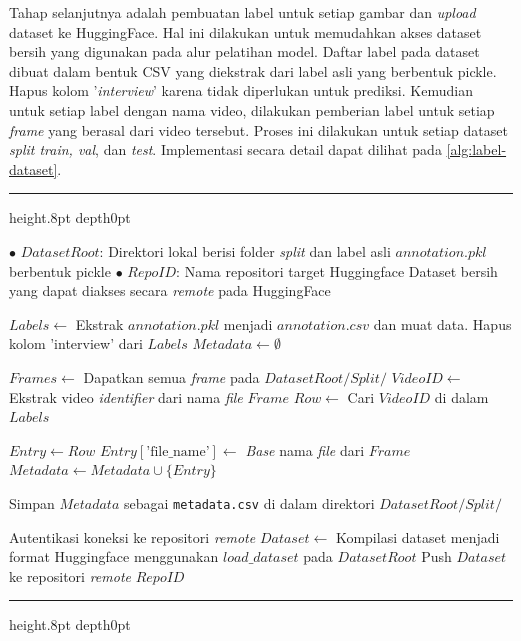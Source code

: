 Tahap selanjutnya adalah pembuatan label untuk setiap gambar dan \textit{upload} dataset ke HuggingFace. Hal ini dilakukan untuk memudahkan akses dataset bersih yang digunakan pada alur pelatihan model. Daftar label pada dataset dibuat dalam bentuk CSV yang diekstrak dari label asli yang berbentuk pickle. Hapus kolom '\textit{interview}' karena tidak diperlukan untuk prediksi. Kemudian untuk setiap label dengan nama video, dilakukan pemberian label untuk setiap \textit{frame} yang berasal dari video tersebut. Proses ini dilakukan untuk setiap dataset \textit{split train, val}, dan \textit{test}. Implementasi secara detail dapat dilihat pada \autoref{alg:label-dataset}.

{
	\vspace{2ex}
	\hrule height.8pt depth0pt \kern5pt
	
	\begin{algorithmic}[1]
		\Input 
		\Statex $\bullet$ $DatasetRoot$: Direktori lokal berisi folder \textit{split} dan label asli $annotation.pkl$ berbentuk pickle
		\Statex $\bullet$ $RepoID$: Nama repositori target Huggingface
		\Output Dataset bersih yang dapat diakses secara \textit{remote} pada HuggingFace
		
		\State $Labels \gets$ Ekstrak $annotation.pkl$ menjadi $annotation.csv$ dan muat data.
		\State Hapus kolom 'interview' dari $Labels$
		\State $Metadata \gets \emptyset$
		
		\State $Frames \gets$ Dapatkan semua \textit{frame} pada $DatasetRoot/Split/$
		\State $VideoID \gets$ Ekstrak video \textit{identifier} dari nama \textit{file} $Frame$
		\State $Row \gets$ Cari $VideoID$ di dalam $Labels$
		
		\State $Entry \gets Row$
		\State $Entry[\text{'file\_name'}] \gets$ \textit{Base} nama \textit{file} dari $Frame$
		\State $Metadata \gets Metadata \cup \{Entry\}$
		\EndIf
		\EndFor
		
		\State Simpan $Metadata$ sebagai \texttt{metadata.csv} di dalam direktori $DatasetRoot/Split/$
		\EndFor
		
		\State Autentikasi koneksi ke repositori \textit{remote}
		\State $Dataset \gets$ Kompilasi dataset menjadi format Huggingface menggunakan $load\_dataset$ pada $DatasetRoot$
		\State Push $Dataset$ ke repositori \textit{remote} $RepoID$
	\end{algorithmic}
	\nopagebreak %
	\kern2pt\hrule height.8pt depth0pt \kern15pt 
	\nopagebreak
	
	\label{alg:label-dataset}
}

